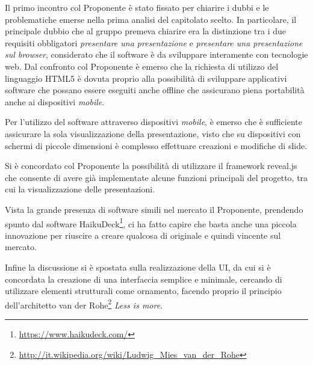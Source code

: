Il primo incontro col Proponente è stato fissato per chiarire i dubbi e le problematiche emerse nella prima analisi del capitolato scelto. In particolare, il principale dubbio che al gruppo premeva chiarire era la distinzione tra i due requisiti obbligatori \textit{presentare una presentazione} e \textit{presentare una presentazione sul browser}, considerato che il software è da sviluppare interamente con tecnologie web. Dal confronto col Proponente è emerso che la richiesta di utilizzo del linguaggio HTML5 è dovuta proprio alla possibilità di sviluppare applicativi software che possano essere eseguiti anche offline che assicurano piena portabilità anche ai dispositivi \textit{mobile}. 

\noindent Per l'utilizzo del software \PROGETTO{} attraverso dispositivi \textit{mobile}, è emerso che è sufficiente assicurare la sola visualizzazione della presentazione, visto che su dispositivi con schermi di piccole dimensioni è complesso effettuare creazioni e modifiche di slide.

\noindent Si è concordato col Proponente la possibilità di utilizzare il framework reveal.js che consente di avere già implementate alcune funzioni principali del progetto, tra cui la visualizzazione delle presentazioni.

\noindent Vista la grande presenza di software simili nel mercato il Proponente, prendendo spunto dal software HaikuDeck\footnote{\url{https://www.haikudeck.com/}}, ci ha fatto capire che basta anche una piccola innovazione per riuscire a creare qualcosa di originale e quindi vincente sul mercato. 

\noindent Infine la discussione si è spostata sulla realizzazione della UI, da cui si è concordata la creazione di una interfaccia semplice e minimale, cercando di utilizzare elementi strutturali come ornamento, facendo proprio il principio dell'architetto van der Rohe\footnote{\url{http://it.wikipedia.org/wiki/Ludwig_Mies_van_der_Rohe}} \textit{Less is more}. 